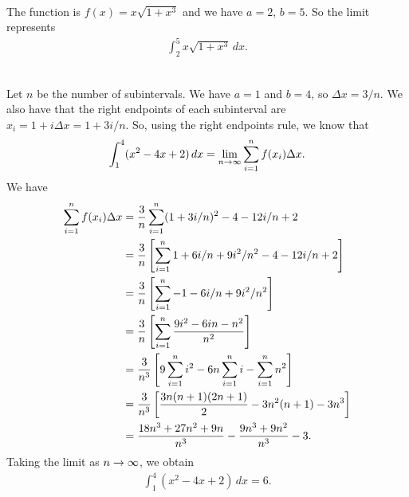 	\spc 
	
	\\
	The function is $f(x) = x \sqrt{1 + x^3}$ and we have $a = 2$, $b = 5$. So the limit represents
		\begin{align*}
		\int_2^5 x \sqrt{1 + x^3} \, dx .
		\end{align*}
		
	\spc
	
	\\
	Let $n$ be the number of subintervals. We have $a = 1$ and $b = 4$, so $\Delta x = 3/n$. We also have that the right endpoints of each subinterval are $x_i = 1 + i \Delta x = 1 + 3i/n$. So, using the right endpoints rule, we know that
		\begin{align*}
		\int_1^4 (x^2 - 4x + 2 ) \, dx = \lim_{n \rightarrow \infty} \sum_{i = 1}^n f(x_i) \Delta x .
		\end{align*}
	We have
		\begin{align*}
		\sum_{i = 1}^n f(x_i) \Delta x &= \frac{3}{n} \sum_{i = 1}^n (1 + 3i/n)^2 - 4 - 12i/n + 2 \\
		&= \frac{3}{n} \left[ \sum_{i = 1}^n 1 + 6i/n + 9i^2/n^2 - 4 - 12i/n + 2 \right] \\
		&= \frac{3}{n} \left[ \sum_{i = 1}^n -1 - 6i/n + 9i^2/n^2 \right] \\
		&= \frac{3}{n} \left[ \sum_{i = 1}^n \frac{9i^2 - 6in - n^2}{n^2} \right] \\
		&= \frac{3}{n^3} \left[ 9\sum_{i = 1}^n i^2 - 6n \sum_{i = 1}^n i - \sum_{i = 1}^n n^2 \right] \\
		&= \frac{3}{n^3} \left[ \frac{3n (n + 1) (2n + 1)}{2} - 3 n^2 (n + 1) - 3n^3 \right] \\
		&= \frac{18n^3 + 27n^2 + 9n}{n^3} - \frac{9n^3 + 9n^2}{n^3} - 3 .
		\end{align*}
	Taking the limit as $n \rightarrow \infty$, we obtain
		\begin{align*}
		\int_1^4 (x^2 - 4x + 2 ) \, dx = 6 .
		\end{align*}
		
	
